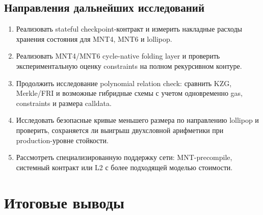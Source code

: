 \documentclass[12pt,a4paper]{article}
\begin{document}
\subsection{Направления дальнейших исследований}

\begin{enumerate}
    \item Реализовать stateful checkpoint-контракт и измерить накладные расходы
    хранения состояния для MNT4, MNT6 и lollipop.
    \item Реализовать MNT4/MNT6 cycle-native folding layer и проверить
    экспериментальную оценку constraints на полном рекурсивном контуре.
    \item Продолжить исследование polynomial relation check: сравнить KZG,
    Merkle/FRI и возможные гибридные схемы с учетом одновременно gas,
    constraints и размера calldata.
    \item Исследовать безопасные кривые меньшего размера по направлению
    lollipop и проверить, сохраняется ли выигрыш двухсловной арифметики при
    production-уровне стойкости.
    \item Рассмотреть специализированную поддержку сети: MNT-precompile,
    системный контракт или L2 с более подходящей моделью стоимости.
\end{enumerate}


\section{Итоговые выводы}
\end{document}
